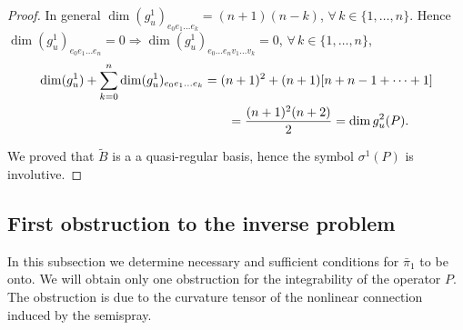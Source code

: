 \begin{proof}
In general $\dim (g_{u}^{1})_{e_{0} e_{1} \dots e_{k}}=(n+1)(n-k)$, $\forall\, k\in \{1,\dots,n\}$.
Hence $\dim (g_{u}^{1})_{e_{0} e_{1} \dots e_{n}}=0\Rightarrow\dim (g_{u}^{1})_{e_{0} \dots e_{n} v_{1} \dots v_{k}}=0$, $\forall\, k\in \{1,\dots,n\}$,
\begin{gather*}
\dim (g_{u}^{1})+\sum_{k=0}^{n}\dim (g_{u}^{1})_{e_{0} e_{1} \dots e_{k}}
   =   (n+1)^{2}+(n+1)[n+n-1+\cdots+1]\\
\hphantom{\dim (g_{u}^{1})+\sum_{k=0}^{n}\dim (g_{u}^{1})_{e_{0} e_{1} \dots e_{k}}}{}   =   \frac{(n+1)^{2}(n+2)}{2}=\dim g_{u}^{2}(P).
   \end{gather*}


We proved that $\tilde{B}$ is a a quasi-regular basis, hence the
symbol $\sigma^{1}(P)$ is involutive.
\end{proof}




\subsection{First obstruction to the inverse problem}

In this subsection we determine necessary and suf\/f\/icient conditions
for $\bar{\pi}_{1}$ to be onto. We will obtain only one obstruction
for the integrability of the operator $P$. The obstruction is due
to the curvature tensor of the nonlinear connection induced by the
semispray.

